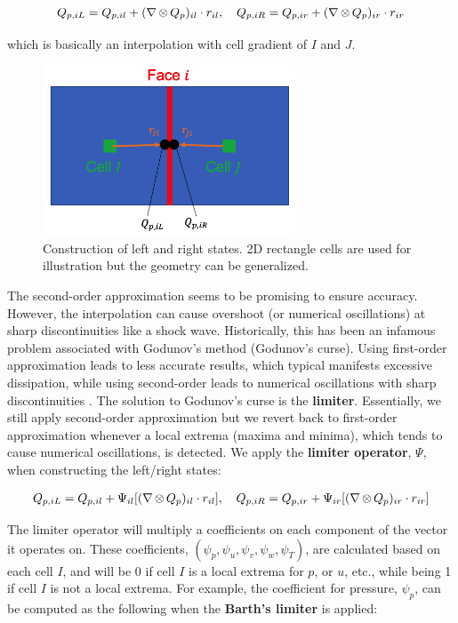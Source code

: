 \documentclass[12pt, letterpaper]{report}
\begin{document}
\begin{align*}
   Q_{p,iL} = Q_{p,il} + (\nabla \mathop{\otimes} Q_p)_{il} \cdot r_{il}, \quad Q_{p,iR} = Q_{p,ir} + (\nabla \mathop{\otimes} Q_p)_{ir} \cdot r_{ir}
\end{align*}

which is basically an interpolation with cell gradient of $I$ and $J$.

\begin{figure}[H]
   \centering
   \includegraphics[height=2in]{Algorithm4.png}
   \caption{Construction of left and right states. 2D rectangle cells are used for illustration but
   the geometry can be generalized.}
   \label{figlrstates}
\end{figure}

The second-order approximation seems to be promising to ensure accuracy. However, the interpolation
can cause overshoot (or numerical oscillations) at sharp discontinuities like a shock wave.
Historically, this has been an infamous problem associated with Godunov's method (Godunov's curse).
Using first-order approximation leads to less accurate results, which typical manifests excessive
dissipation, while using second-order leads to numerical oscillations with sharp discontinuities
\cite{hirsch1988numerical}. The solution to Godunov's curse is the {\bf limiter}. Essentially, we
still apply second-order approximation but we revert back to first-order approximation whenever a
local extrema (maxima and minima), which tends to cause numerical oscillations, is detected. We
apply the {\bf limiter operator}, $\Psi$, when constructing the left/right states:

\begin{align}\label{eqlimiter}
   Q_{p,iL} = Q_{p,il} + \Psi_{il} [(\nabla \mathop{\otimes} Q_p)_{il} \cdot r_{il}], \quad Q_{p,iR} = Q_{p,ir} +
   \Psi_{ir} [(\nabla \mathop{\otimes} Q_p)_{ir} \cdot r_{ir}]
\end{align}

The limiter operator will multiply a coefficients on each component of the vector it operates on. 
These coefficients, $(\psi_p, \psi_u, \psi_v, \psi_w, \psi_T)$, are calculated based on each cell
$I$, and will be 0 if cell $I$ is a local extrema for $p$, or $u$, etc., while being 1 if cell $I$
is not a local extrema. For example, the coefficient for pressure, $\psi_p$, can be computed as the
following when the {\bf Barth's limiter} is applied:
\end{document}
